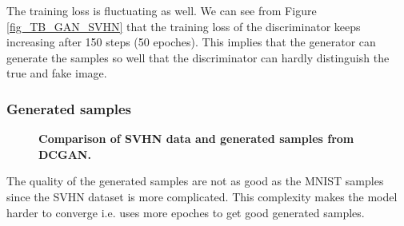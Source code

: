 \documentclass{article}
\newcommand{\mycaption}[2]{\caption[#1]{\textbf{#1.} #2}}
\begin{document}
The training loss is fluctuating as well. We can see from Figure \ref{fig_TB_GAN_SVHN} that the training loss of the discriminator keeps increasing after 150 steps (50 epoches). This implies that the generator can generate the samples so well that the discriminator can hardly distinguish the true and fake image.

\subsubsection{Generated samples}

\begin{figure}[!htb]
  \centering
  \mycaption{Comparison of SVHN data and generated samples from DCGAN}{}
  \label{fig_DCGAN_SVHN}
\end{figure}

The quality of the generated samples are not as good as the MNIST samples since the SVHN dataset is more complicated.
This complexity makes the model harder to converge i.e. uses more epoches to get good generated samples.
\end{document}
